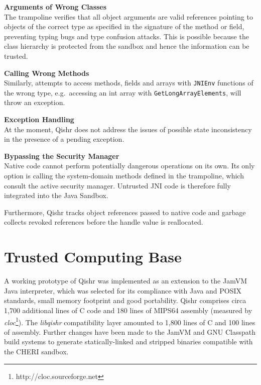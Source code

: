 \documentclass[a4paper,12pt,twoside,openright]{report}
\newcommand{\keyword}[1]{\textsf{#1}}
\newcommand{\tool}[1]{\emph{#1}}
\newcommand{\lib}[1]{\tool{lib#1}}
\begin{document}
\begin{description}
\item{\bf Arguments of Wrong Classes} \\
The trampoline verifies that all object arguments are valid references pointing to objects of the correct type as specified in the signature of the method or field, preventing typing bugs and type confusion attacks. This is possible because the class hierarchy is protected from the sandbox and hence the information can be trusted.

\item{\bf Calling Wrong Methods} \\
Similarly, attempts to access methods, fields and arrays with \texttt{JNIEnv} functions of the wrong type, e.g.\ accessing an \keyword{int} array with \texttt{Get\-Long\-Array\-Elements}, will throw an exception.

\item{\bf Exception Handling} \\
At the moment, Qishr does not address the issues of possible state inconsistency in the presence of a pending exception.

\item{\bf Bypassing the Security Manager} \\
Native code cannot perform potentially dangerous operations on its own. Its only option is calling the system-domain methods defined in the trampoline, which consult the active security manager. Untrusted JNI code is therefore fully integrated into the Java Sandbox.
\end{description}

Furthermore, Qishr tracks object references passed to native code and garbage collects revoked references before the handle value is reallocated.

\section{Trusted Computing Base}

A working prototype of Qishr was implemented as an extension to the JamVM Java interpreter, which was selected for its compliance with Java and POSIX standards, small memory footprint and good portability. Qishr comprises circa 1,700 additional lines of C code and 180 lines of MIPS64 assembly (measured by \emph{cloc}\footnote{http://cloc.sourceforge.net}). The \lib{qishr} compatibility layer amounted to 1,800 lines of C and 100 lines of assembly. Further changes have been made to the JamVM and GNU Classpath build systems to generate statically-linked and stripped binaries compatible with the CHERI sandbox.
\end{document}

